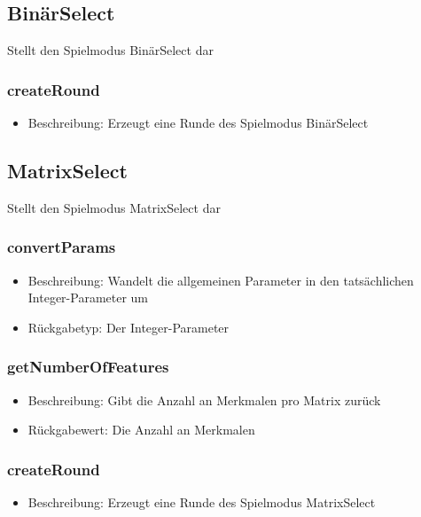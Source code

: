 \documentclass[a4paper]{scrreprt}
\begin{document}
	\subsection{BinärSelect}
	Stellt den Spielmodus BinärSelect dar
	\subsubsection{createRound}
	\begin{itemize}
		\item Beschreibung: Erzeugt eine Runde des Spielmodus BinärSelect
	\end{itemize}
	
	\subsection{MatrixSelect}
	Stellt den Spielmodus MatrixSelect dar
	\subsubsection{convertParams}
	\begin{itemize}
		\item Beschreibung: Wandelt die allgemeinen Parameter in den tatsächlichen Integer-Parameter um
		\item Rückgabetyp: Der Integer-Parameter
	\end{itemize}
	\subsubsection{getNumberOfFeatures}
	\begin{itemize}
		\item Beschreibung: Gibt die Anzahl an Merkmalen pro Matrix zurück
		\item Rückgabewert: Die Anzahl an Merkmalen
	\end{itemize}
	\subsubsection{createRound}
	\begin{itemize}
		\item Beschreibung: Erzeugt eine Runde des Spielmodus MatrixSelect
	\end{itemize}
	
	
\end{document}
